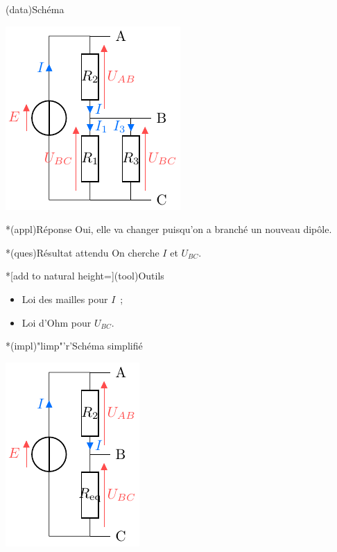 \documentclass[../../main/main.tex]{subfiles}
\begin{document}
{\begin{tcbraster}[raster columns=3, raster equal height=rows]
    \begin{tcb}(data){Schéma}
        \begin{center}
            \includegraphics{divtens_b}
        \end{center}
    \end{tcb}
    \begin{tcolorbox}[blankest, raster multicolumn=1, space to=\myspace]
        \begin{tcbraster}[raster columns=1]
            \begin{tcb}*(appl){Réponse}
                Oui, elle va changer puisqu'on a branché un nouveau dipôle.
            \end{tcb}
            \begin{tcb}*(ques){Résultat attendu}
                On cherche $I$ et $U_{BC}$.
            \end{tcb}
            \begin{tcb}*[add to natural height=\myspace](tool){Outils}
                \begin{itemize}[leftmargin=10pt]
                    \item Loi des mailles pour $I$~;
                    \item Loi d'Ohm pour $U_{BC}$.
                \end{itemize}
            \end{tcb}
        \end{tcbraster}
    \end{tcolorbox}
    \begin{tcb}*(impl)"limp"'r'{Schéma simplifié}
        \begin{center}
            \includegraphics{divtens_b-simple}

\end{center}
\end{tcb}
\end{tcbraster}}
\end{document}
